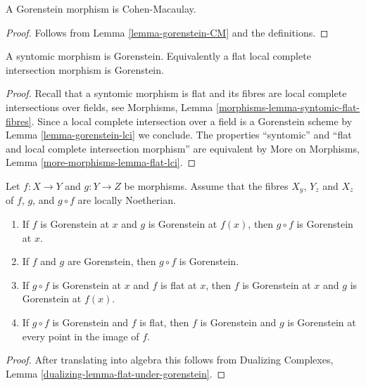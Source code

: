 \begin{lemma}
\label{lemma-gorenstein-CM-morphism}
A Gorenstein morphism is Cohen-Macaulay.
\end{lemma}

\begin{proof}
Follows from Lemma \ref{lemma-gorenstein-CM} and the definitions.
\end{proof}

\begin{lemma}
\label{lemma-lci-gorenstein}
A syntomic morphism is Gorenstein. Equivalently a flat
local complete intersection morphism is Gorenstein.
\end{lemma}

\begin{proof}
Recall that a syntomic morphism is flat and its fibres
are local complete intersections over fields, see
Morphisms, Lemma \ref{morphisms-lemma-syntomic-flat-fibres}.
Since a local complete intersection over a field is a Gorenstein scheme
by Lemma \ref{lemma-gorenstein-lci} we conclude.
The properties ``syntomic'' and ``flat and local
complete intersection morphism'' are equivalent by
More on Morphisms, Lemma \ref{more-morphisms-lemma-flat-lci}.
\end{proof}

\begin{lemma}
\label{lemma-composition-gorenstein}
Let $f : X \to Y$ and $g : Y \to Z$ be morphisms. Assume that the
fibres $X_y$, $Y_z$ and $X_z$ of $f$, $g$, and $g \circ f$ are
locally Noetherian.
\begin{enumerate}
\item If $f$ is Gorenstein at $x$ and $g$ is Gorenstein
at $f(x)$, then $g \circ f$ is Gorenstein at $x$.
\item If $f$ and $g$ are Gorenstein, then $g \circ f$ is Gorenstein.
\item If $g \circ f$ is Gorenstein at $x$ and $f$ is flat at $x$,
then $f$ is Gorenstein at $x$ and $g$ is Gorenstein at $f(x)$.
\item If $g \circ f$ is Gorenstein and $f$ is flat, then
$f$ is Gorenstein and $g$ is Gorenstein at every point in
the image of $f$.
\end{enumerate}
\end{lemma}

\begin{proof}
After translating into algebra this follows from
Dualizing Complexes, Lemma \ref{dualizing-lemma-flat-under-gorenstein}.
\end{proof}

